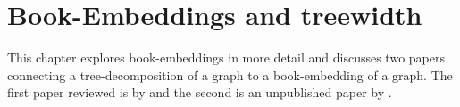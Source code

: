 \chapter{Book-Embeddings and treewidth}\label{chap:book-embeddings}

This chapter explores book-embeddings in more detail and discusses two papers connecting a tree-decomposition of a graph to a book-embedding of a graph. The first paper reviewed is by \textcite{ganleyPagenumberTrees2001} and the second is an unpublished paper by \textcite{hickingbothamStackNumberCliqueSum2023}. 











